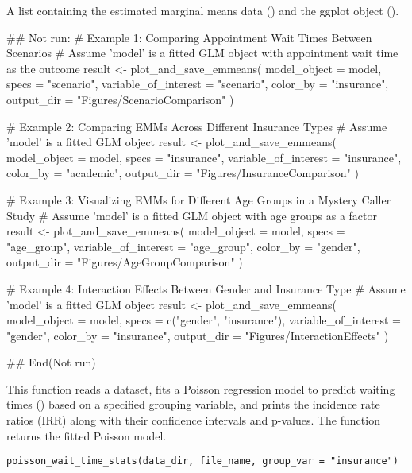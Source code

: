 \documentclass[a4paper]{book}
\begin{document}
%
\begin{Value}
A list containing the estimated marginal means data () and the ggplot object ().
\end{Value}
%
\begin{Examples}
\begin{ExampleCode}
## Not run: 
# Example 1: Comparing Appointment Wait Times Between Scenarios
# Assume 'model' is a fitted GLM object with appointment wait time as the outcome
result <- plot_and_save_emmeans(
  model_object = model,
  specs = "scenario",
  variable_of_interest = "scenario",
  color_by = "insurance",
  output_dir = "Figures/ScenarioComparison"
)

# Example 2: Comparing EMMs Across Different Insurance Types
# Assume 'model' is a fitted GLM object
result <- plot_and_save_emmeans(
  model_object = model,
  specs = "insurance",
  variable_of_interest = "insurance",
  color_by = "academic",
  output_dir = "Figures/InsuranceComparison"
)

# Example 3: Visualizing EMMs for Different Age Groups in a Mystery Caller Study
# Assume 'model' is a fitted GLM object with age groups as a factor
result <- plot_and_save_emmeans(
  model_object = model,
  specs = "age_group",
  variable_of_interest = "age_group",
  color_by = "gender",
  output_dir = "Figures/AgeGroupComparison"
)

# Example 4: Interaction Effects Between Gender and Insurance Type
# Assume 'model' is a fitted GLM object
result <- plot_and_save_emmeans(
  model_object = model,
  specs = c("gender", "insurance"),
  variable_of_interest = "gender",
  color_by = "insurance",
  output_dir = "Figures/InteractionEffects"
)

## End(Not run)

\end{ExampleCode}
\end{Examples}
%
\begin{Description}
This function reads a dataset, fits a Poisson regression model to predict
waiting times () based on a specified grouping variable,
and prints the incidence rate ratios (IRR) along with their confidence intervals and p-values.
The function returns the fitted Poisson model.
\end{Description}
%
\begin{Usage}
\begin{verbatim}
poisson_wait_time_stats(data_dir, file_name, group_var = "insurance")
\end{verbatim}
\end{Usage}
\end{document}
